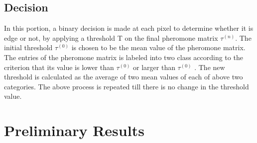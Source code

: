 \documentclass[paper=a4, fontsize=11pt]{scrartcl}
\numberwithin{equation}{section}		%
\numberwithin{figure}{section}			%
\numberwithin{table}{section}				%
\begin{document}
\subsection{Decision}

In this portion, a binary decision is made at each pixel to determine whether it is edge or not, by applying a threshold T on the final pheromone matrix $\tau^{(n)}$. The initial threshold $\tau^{(0)}$ is chosen to be the mean value of the pheromone matrix. The entries of the pheromone matrix is labeled into two class according to the criterion that its value is lower than $\tau^{(0)}$ or larger than $\tau^{(0)}$ . The new threshold is calculated as the average of two mean values of each of above two categories. The above process is repeated till there is no change in the threshold value.

\vspace{1cm}

\section{Preliminary Results}
\end{document}
